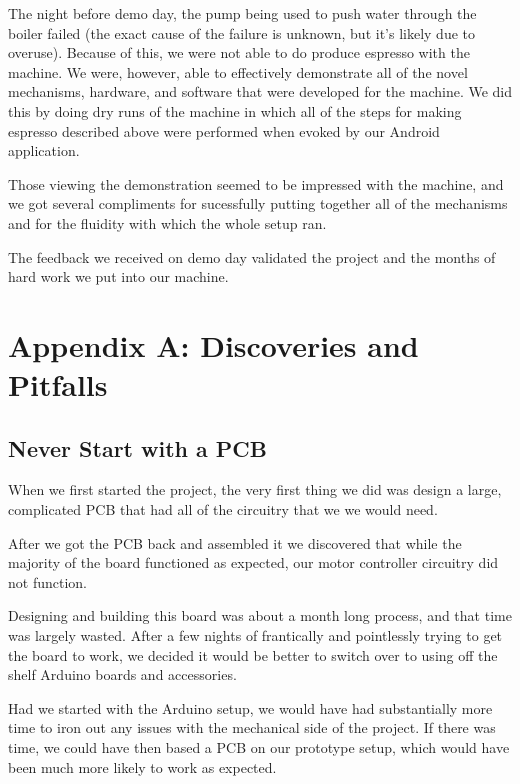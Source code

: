 \documentclass[conference]{IEEEtran}
\begin{document}
The night before demo day, the pump being used to push water through the boiler
failed (the exact cause of the failure is unknown, but it's likely due to
overuse). Because of this, we were not able to do produce espresso with the
machine. We were, however, able to effectively demonstrate all of the novel
mechanisms, hardware, and software that were developed for the machine. We did
this by doing dry runs of the machine in which all of the steps for making
espresso described above were performed when evoked by our Android application.

Those viewing the demonstration seemed to be impressed with the machine, and we
got several compliments for sucessfully putting together all of the mechanisms
and for the fluidity with which the whole setup ran.

The feedback we received on demo day validated the project and the months of
hard work we put into our machine.

\section{Appendix A: Discoveries and Pitfalls}
\subsection{Never Start with a PCB}
When we first started the project, the very first thing we did was design a
large, complicated PCB that had all of the circuitry that we 
we would need.

After we got the PCB back and assembled it we discovered that while the
majority of the board functioned as expected, our motor controller circuitry did
not function. 

Designing and building this board was about a month long process, and that time
was largely wasted. After a few nights of frantically and pointlessly trying to
get the board to work, we decided it would be better to switch over to using
off the shelf Arduino boards and accessories.

Had we started with the Arduino setup, we would have had substantially more time
to iron out any issues with the mechanical side of the project. If there was
time, we could have then based a PCB on our prototype setup, which would have
been much more likely to work as expected.

\end{document}
